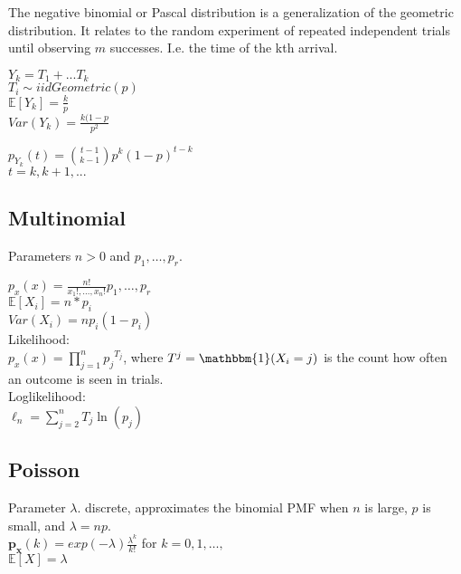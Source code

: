 The negative binomial or Pascal distribution is a generalization of the geometric distribution. It relates to the random experiment of repeated independent trials until observing $m$ successes. I.e. the time of the kth arrival.

$Y_k=T_1+...T_k$\\

$T_i \sim iid Geometric(p)$\\

$\mathbb{E}[Y_k]=\frac{k}{p}$\\

$Var(Y_k)= \frac{k(1-p}{p^2}$

$p_{Y_k}(t) ={\binom{t-1}{ k-1}}p^k(1-p)^{t-k}$\\

$t=k,k+1,...$


\subsection*{Multinomial}

Parameters $n>0$ and $p_1, \ldots, p_r$.

$p_x(x)= \frac{n!}{x_1!,\ldots,x_n!} p_1, \ldots, p_r$\\


$\mathbb{E}[X_i]=n*p_i$\\

$Var(X_i)=np_i(1-p_i)$\\


Likelihood:\\

$p_x(x)= \prod _{j=1}^{n}{p_{{j}}}^{T_{{j}}}$, where $T^j=\mathbbm{1}( X_i=j)$ is the count how often an outcome is seen in trials. \\

Loglikelihood:\\
$\ell_n= \sum _{j=2}^{n}T_{{j}}\ln  \left( p_{{j}} \right)$\\


\subsection*{Poisson}
Parameter $\lambda$. discrete, approximates the binomial PMF when $n$ is large, $p$ is small, and $\lambda = np$.\\

$\mathbf{p_x}(k)=exp(-\lambda)\frac{\lambda^k}{k!}$ for $k=0,1, \ldots,$\\

$\mathbb{E}[X]=\lambda$\\

